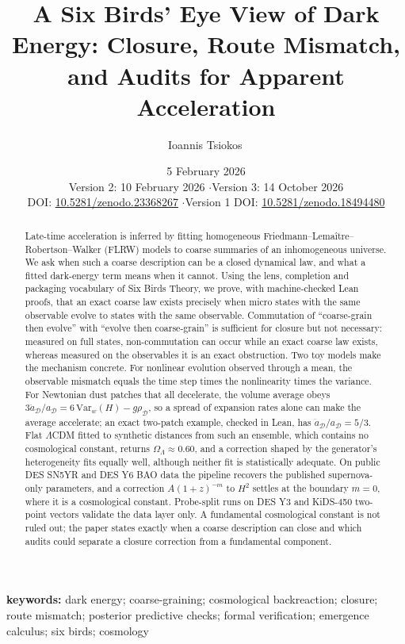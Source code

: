 \documentclass[11pt]{article}
\title{A Six Birds' Eye View of Dark Energy: Closure, Route Mismatch, and Audits for Apparent Acceleration}
\author{Ioannis Tsiokos\,\orcidlink{0009-0009-7659-5964}}
\affiliation{}
\date{5 February 2026\\[4pt]{\small Version 2: 10 February 2026 \quad$\cdot$\quad Version 3: 14 October 2026}\\[2pt]{\small DOI: \href{https://doi.org/10.5281/zenodo.23368267}{10.5281/zenodo.23368267} \quad$\cdot$\quad Version 1 DOI: \href{https://doi.org/10.5281/zenodo.18494480}{10.5281/zenodo.18494480}}}
\makeatletter
\newcommand{\printaffiliation}{\begin{center}\small \@affiliation\end{center}}
\theoremstyle{plain}
\theoremstyle{definition}
\theoremstyle{remark}
\makeatother
\begin{document}
\maketitle
\thispagestyle{firstpage}
\printaffiliation

\begin{abstract}
Late-time acceleration is inferred by fitting homogeneous Friedmann--Lema\^{i}tre--Robertson--Walker (FLRW) models to coarse summaries of an inhomogeneous universe. We ask when such a coarse description can be a closed dynamical law, and what a fitted dark-energy term means when it cannot. Using the lens, completion and packaging vocabulary of Six Birds Theory, we prove, with machine-checked Lean proofs, that an exact coarse law exists precisely when micro states with the same observable evolve to states with the same observable. Commutation of ``coarse-grain then evolve'' with ``evolve then coarse-grain'' is sufficient for closure but not necessary: measured on full states, non-commutation can occur while an exact coarse law exists, whereas measured on the observables it is an exact obstruction. Two toy models make the mechanism concrete. For nonlinear evolution observed through a mean, the observable mismatch equals the time step times the nonlinearity times the variance. For Newtonian dust patches that all decelerate, the volume average obeys $3\ddot a_{\mathcal D}/a_{\mathcal D}=6\,\mathrm{Var}_w(H)-g\rho_{\mathcal D}$, so a spread of expansion rates alone can make the average accelerate; an exact two-patch example, checked in Lean, has $\ddot a_{\mathcal D}/a_{\mathcal D}=5/3$. Flat $\Lambda$CDM fitted to synthetic distances from such an ensemble, which contains no cosmological constant, returns $\Omega_\Lambda\approx0.60$, and a correction shaped by the generator's heterogeneity fits equally well, although neither fit is statistically adequate. On public DES SN5YR and DES Y6 BAO data the pipeline recovers the published supernova-only parameters, and a correction $A(1+z)^{-m}$ to $H^2$ settles at the boundary $m=0$, where it is a cosmological constant. Probe-split runs on DES Y3 and KiDS-450 two-point vectors validate the data layer only. A fundamental cosmological constant is not ruled out; the paper states exactly when a coarse description can close and which audits could separate a closure correction from a fundamental component.
\end{abstract}
\noindent\textbf{keywords:} dark energy; coarse-graining; cosmological backreaction; closure; route mismatch; posterior predictive checks; formal verification; emergence calculus; six birds; cosmology
\end{document}
